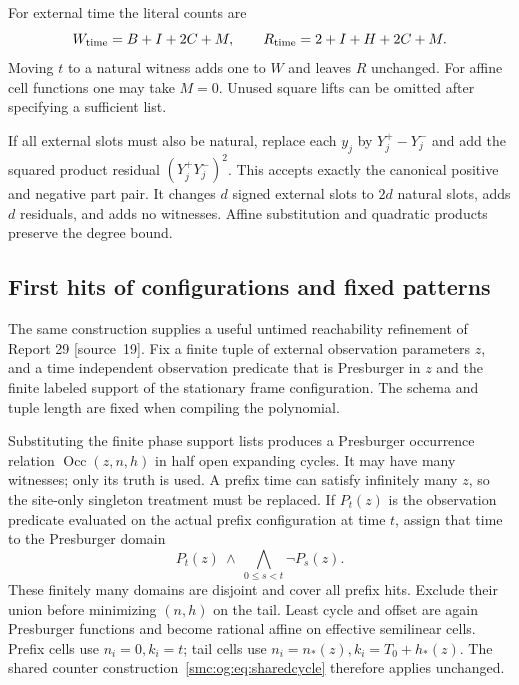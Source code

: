 \documentclass[11pt,letterpaper]{article}
\numberwithin{equation}{section}
\theoremstyle{definition}
\theoremstyle{remark}
\begin{document}
For external time the literal counts are
\begin{equation}\label{smc:og:eq:timecounts}
 W_{\rm time}=B+I+2C+M,\qquad
 R_{\rm time}=2+I+H+2C+M.
\end{equation}
Moving $t$ to a natural witness adds one to $W$ and leaves $R$ unchanged. For affine cell functions one may take $M=0$. Unused square lifts can be omitted after specifying a sufficient list.

If all external slots must also be natural, replace each $y_j$ by $Y_j^+-Y_j^-$ and add the squared product residual $(Y_j^+Y_j^-)^2$. This accepts exactly the canonical positive and negative part pair. It changes $d$ signed external slots to $2d$ natural slots, adds $d$ residuals, and adds no witnesses. Affine substitution and quadratic products preserve the degree bound.

\subsection{First hits of configurations and fixed patterns}
The same construction supplies a useful untimed reachability refinement of Report 29 \textup{[source~19]}. Fix a finite tuple of external observation parameters $z$, and a time independent observation predicate that is Presburger in $z$ and the finite labeled support of the stationary frame configuration. The schema and tuple length are fixed when compiling the polynomial.

Substituting the finite phase support lists produces a Presburger occurrence relation $\operatorname{Occ}(z,n,h)$ in half open expanding cycles. It may have many witnesses; only its truth is used. A prefix time can satisfy infinitely many $z$, so the site-only singleton treatment must be replaced. If $P_t(z)$ is the observation predicate evaluated on the actual prefix configuration at time $t$, assign that time to the Presburger domain
\[
 P_t(z)\ \wedge\ \bigwedge_{0\le s<t}\neg P_s(z).
\]
These finitely many domains are disjoint and cover all prefix hits. Exclude their union before minimizing $(n,h)$ on the tail. Least cycle and offset are again Presburger functions and become rational affine on effective semilinear cells. Prefix cells use $n_i=0,k_i=t$; tail cells use $n_i=n_*(z),k_i=T_0+h_*(z)$. The shared counter construction~\eqref{smc:og:eq:sharedcycle} therefore applies unchanged.
\end{document}
